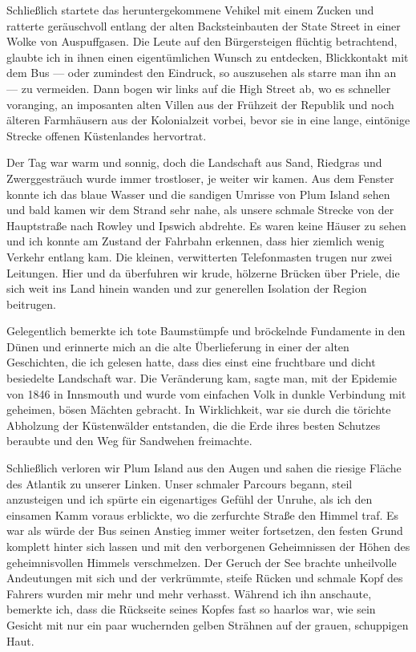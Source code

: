 Schließlich startete das heruntergekommene Vehikel mit einem Zucken und ratterte geräuschvoll entlang der alten Backsteinbauten der State Street in einer Wolke von Auspuffgasen. Die Leute auf den Bürgersteigen flüchtig betrachtend, glaubte ich in ihnen einen eigentümlichen Wunsch zu entdecken, Blickkontakt mit dem Bus --- oder zumindest den Eindruck, so auszusehen als starre man ihn an --- zu vermeiden. Dann bogen wir links auf die High Street ab, wo es schneller voranging, an imposanten alten Villen aus der Frühzeit der Republik und noch älteren Farmhäusern aus der Kolonialzeit vorbei, bevor sie in eine lange, eintönige Strecke offenen Küstenlandes hervortrat.

Der Tag war warm und sonnig, doch die Landschaft aus Sand, Riedgras und Zwerggesträuch wurde immer trostloser, je weiter wir kamen. Aus dem Fenster konnte ich das blaue Wasser und die sandigen Umrisse von Plum Island sehen und bald kamen wir dem Strand sehr nahe, als unsere schmale Strecke von der Hauptstraße nach Rowley und Ipswich abdrehte. Es waren keine Häuser zu sehen und ich konnte am Zustand der Fahrbahn erkennen, dass hier ziemlich wenig Verkehr entlang kam. Die kleinen, verwitterten Telefonmasten trugen nur zwei Leitungen. Hier und da überfuhren wir krude, hölzerne Brücken über Priele, die sich weit ins Land hinein wanden und zur generellen Isolation der Region beitrugen.

Gelegentlich bemerkte ich tote Baumstümpfe und bröckelnde Fundamente in den Dünen und erinnerte mich an die alte Überlieferung in einer der alten Geschichten, die ich gelesen hatte, dass dies einst eine fruchtbare und dicht besiedelte Landschaft war. Die Veränderung kam, sagte man, mit der Epidemie von 1846 in Innsmouth und wurde vom einfachen Volk in dunkle Verbindung mit geheimen, bösen Mächten gebracht. In Wirklichkeit, war sie durch die törichte Abholzung der Küstenwälder entstanden, die die Erde ihres besten Schutzes beraubte und den Weg für Sandwehen freimachte.

Schließlich verloren wir Plum Island aus den Augen und sahen die riesige Fläche des Atlantik zu unserer Linken. Unser schmaler Parcours begann, steil anzusteigen und ich spürte ein eigenartiges Gefühl der Unruhe, als ich den einsamen Kamm voraus erblickte, wo die zerfurchte Straße den Himmel traf. Es war als würde der Bus seinen Anstieg immer weiter fortsetzen, den festen Grund komplett hinter sich lassen und mit den verborgenen Geheimnissen der Höhen des geheimnisvollen Himmels verschmelzen. Der Geruch der See brachte unheilvolle Andeutungen mit sich und der verkrümmte, steife Rücken und schmale Kopf des Fahrers wurden mir mehr und mehr verhasst. Während ich ihn anschaute, bemerkte ich, dass die Rückseite seines Kopfes fast so haarlos war, wie sein Gesicht mit nur ein paar wuchernden gelben Strähnen auf der grauen, schuppigen Haut.

